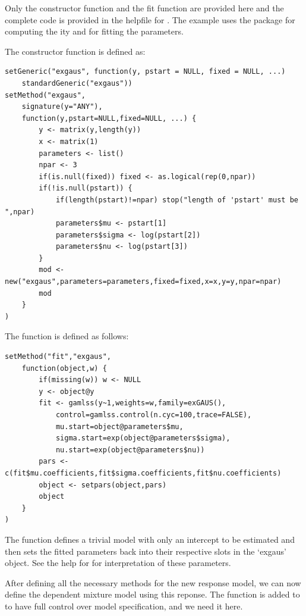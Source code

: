 \documentclass[article]{jss}
\begin{document}
Only the constructor function and the fit function are provided here
and the complete code is provided in the helpfile for . 
The  example uses the  package for 
computing the ity and for fitting the parameters. 

The constructor function is defined as: 
\begin{verbatim}
setGeneric("exgaus", function(y, pstart = NULL, fixed = NULL, ...) 
	standardGeneric("exgaus"))
setMethod("exgaus", 
	signature(y="ANY"), 
	function(y,pstart=NULL,fixed=NULL, ...) {
		y <- matrix(y,length(y))
		x <- matrix(1)
		parameters <- list()
		npar <- 3
		if(is.null(fixed)) fixed <- as.logical(rep(0,npar))
		if(!is.null(pstart)) {
			if(length(pstart)!=npar) stop("length of 'pstart' must be ",npar)
			parameters$mu <- pstart[1]
			parameters$sigma <- log(pstart[2])
			parameters$nu <- log(pstart[3])
		}
		mod <- new("exgaus",parameters=parameters,fixed=fixed,x=x,y=y,npar=npar)
		mod
	}
)
\end{verbatim}

The  function is defined as follows: 
\begin{verbatim}
setMethod("fit","exgaus",
	function(object,w) {
		if(missing(w)) w <- NULL
		y <- object@y
		fit <- gamlss(y~1,weights=w,family=exGAUS(),
			control=gamlss.control(n.cyc=100,trace=FALSE),
			mu.start=object@parameters$mu,
			sigma.start=exp(object@parameters$sigma),
			nu.start=exp(object@parameters$nu))
		pars <- c(fit$mu.coefficients,fit$sigma.coefficients,fit$nu.coefficients)
		object <- setpars(object,pars)
		object
	}
)
\end{verbatim}

The  function defines a trivial  model with 
only an intercept to be estimated and then sets the fitted parameters 
back into their respective slots in the `exgaus' object. See the help 
for  for interpretation of these parameters. 

After defining all the necessary methods for the new response model, 
we can  now define the dependent mixture model using this reponse. 
The function  is added to  to have 
full control over model specification, and we need it here. 
\end{document}
